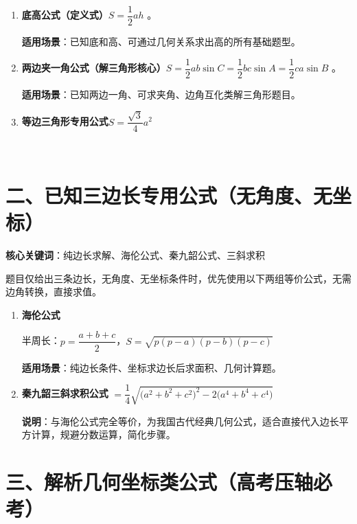 \documentclass[10pt,CJKmath]{ctexart}
\begin{document}
\begin{enumerate}
	\item \textbf{ 底高公式（定义式）}\colorbox{yellow!10}{$S=\dfrac{1}{2}ah$}
。

\textbf{适用场景}：已知底和高、可通过几何关系求出高的所有基础题型。

\item \textbf{两边夹一角公式（解三角形核心）}\colorbox{yellow!10}{$S=\dfrac{1}{2}ab\sin C = \dfrac{1}{2}bc\sin A=\dfrac{1}{2}ca\sin B$}
。

\textbf{适用场景}：已知两边一角、可求夹角、边角互化类解三角形题目。

\item \textbf{等边三角形专用公式}\colorbox{yellow!10}{$S=\dfrac{\sqrt{3}}{4}a^2$}
\end{enumerate}

~

\section*{二、已知三边长专用公式（无角度、无坐标）}

\textbf{核心关键词}：纯边长求解、海伦公式、秦九韶公式、三斜求积

题目仅给出三条边长，无角度、无坐标条件时，优先使用以下两组等价公式，无需边角转换，直接求值。
\begin{enumerate}[resume]
	\item \textbf{海伦公式}

半周长：$p=\dfrac{a+b+c}{2}$，\colorbox{yellow!10}{$S=\sqrt{p(p-a)(p-b)(p-c)}$}

\textbf{适用场景}：纯边长条件、坐标求边长后求面积、几何计算题。

	\item \textbf{秦九韶三斜求积公式} \colorbox{yellow!10}{$=\dfrac{1}{4}\sqrt{\big(a^2+b^2+c^2\big)^2-2\big(a^4+b^4+c^4\big)}$}

\textbf{说明}：与海伦公式完全等价，为我国古代经典几何公式，适合直接代入边长平方计算，规避分数运算，简化步骤。

\end{enumerate}

\section*{三、解析几何坐标类公式（高考压轴必考）}
\end{document}
